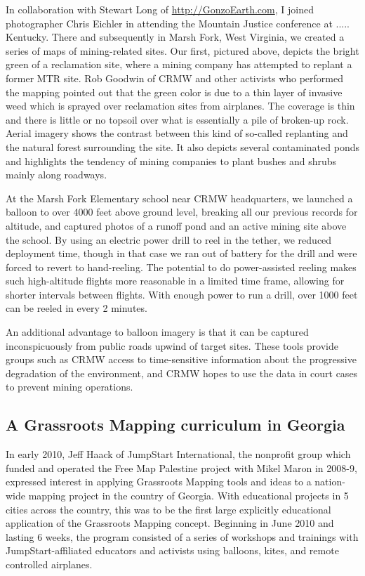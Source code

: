 \documentclass[11pt]{report}
\begin{document}
In collaboration with Stewart Long of \url{http://GonzoEarth.com}, I joined photographer Chris Eichler in attending the Mountain Justice conference at ..... Kentucky. There and subsequently in Marsh Fork, West Virginia, we created a series of maps of mining-related sites. Our first, pictured above, depicts the bright green of a reclamation site, where a mining company has attempted to replant a former MTR site. Rob Goodwin of CRMW and other activists who performed the mapping pointed out that the green color is due to a thin layer of invasive weed which is sprayed over reclamation sites from airplanes. The coverage is thin and there is little or no topsoil over what is essentially a pile of broken-up rock. Aerial imagery shows the contrast between this kind of so-called replanting and the natural forest surrounding the site. It also depicts several contaminated ponds and highlights the tendency of mining companies to plant bushes and shrubs mainly along roadways. 

At the Marsh Fork Elementary school near CRMW headquarters, we launched a balloon to over 4000 feet above ground level, breaking all our previous records for altitude, and captured photos of a runoff pond and an active mining site above the school. By using an electric power drill to reel in the tether, we reduced deployment time, though in that case we ran out of battery for the drill and were forced to revert to hand-reeling. The potential to do power-assisted reeling makes such high-altitude flights more reasonable in a limited time frame, allowing for shorter intervals between flights. With enough power to run a drill, over 1000 feet can be reeled in every 2 minutes. 

An additional advantage to balloon imagery is that it can be captured inconspicuously from public roads upwind of target sites. These tools provide groups such as CRMW access to time-sensitive information about the progressive degradation of the environment, and CRMW hopes to use the data in court cases to prevent mining operations.

\subsection{A Grassroots Mapping curriculum in Georgia}

In early 2010, Jeff Haack of JumpStart International, the nonprofit group which funded and operated the Free Map Palestine project with Mikel Maron in 2008-9, expressed interest in applying Grassroots Mapping tools and ideas to a nation-wide mapping project in the country of Georgia. With educational projects in 5 cities across the country, this was to be the first large explicitly educational application of the Grassroots Mapping concept. Beginning in June 2010 and lasting 6 weeks, the program consisted of a series of workshops and trainings with JumpStart-affiliated educators and activists using balloons, kites, and remote controlled airplanes.
\end{document}
